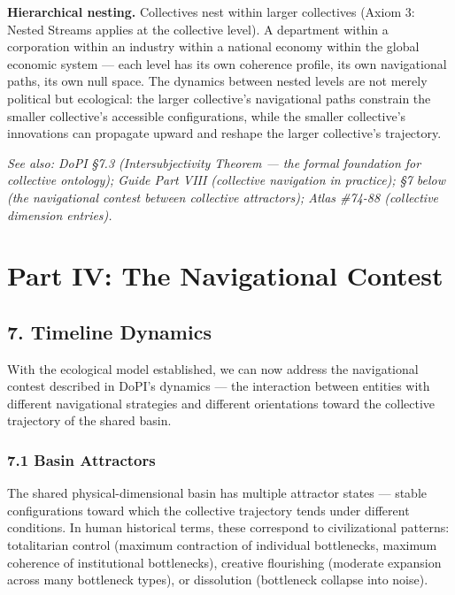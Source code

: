 \textbf{Hierarchical nesting.} Collectives nest within larger collectives (Axiom 3: Nested Streams applies at the collective level). A department within a corporation within an industry within a national economy within the global economic system — each level has its own coherence profile, its own navigational paths, its own null space. The dynamics between nested levels are not merely political but ecological: the larger collective's navigational paths constrain the smaller collective's accessible configurations, while the smaller collective's innovations can propagate upward and reshape the larger collective's trajectory.


\textit{See also: DoPI §7.3 (Intersubjectivity Theorem — the formal foundation for collective ontology); Guide Part VIII (collective navigation in practice); §7 below (the navigational contest between collective attractors); Atlas \#74-88 (collective dimension entries).}


\bigskip\noindent\makebox[\textwidth]{\color{rulegray}\rule{5cm}{0.3pt}}\bigskip


\section*{Part IV: The Navigational Contest}


\subsection*{7. Timeline Dynamics}


With the ecological model established, we can now address the navigational contest described in DoPI's dynamics — the interaction between entities with different navigational strategies and different orientations toward the collective trajectory of the shared basin.


\subsubsection*{7.1 Basin Attractors}


The shared physical-dimensional basin has multiple attractor states — stable configurations toward which the collective trajectory tends under different conditions. In human historical terms, these correspond to civilizational patterns: totalitarian control (maximum contraction of individual bottlenecks, maximum coherence of institutional bottlenecks), creative flourishing (moderate expansion across many bottleneck types), or dissolution (bottleneck collapse into noise).



